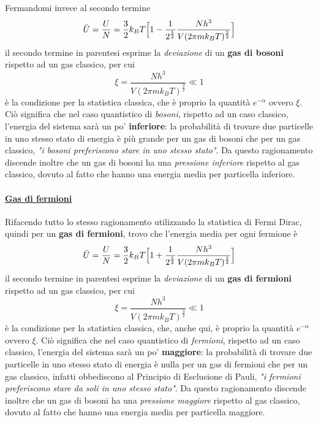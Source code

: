 Fermandomi invece al secondo termine
\begin{equation}
\bar U = \frac{U}{N} = \frac{3}{2} k_B T \Bigl[  1 - \frac{1}{2^{ \frac{5}{2} }}  \frac{N h^3}{V (2\pi m k_B T)^{ \frac{3}{2} }}  \Bigr]
\end{equation}
il secondo termine in parentesi esprime la \textit{deviazione} di un \textbf{gas di bosoni} rispetto ad un gas classico, per cui
\begin{equation}
\xi = \frac{N h^3}{V (2\pi m k_B T)^{ \frac{3}{2} }}  \ll 1 
\end{equation}
è la condizione per la statistica classica, che è proprio la quantità $e^{-\alpha}$ ovvero $\xi$.
Ciò significa che nel caso quantistico di \textit{bosoni}, rispetto ad un caso classico, l'energia del sistema sarà un po' \textbf{inferiore}:
la probabilità di trovare due particelle in uno stesso stato di energia è più grande per un gas di bosoni che per un gas classico, \textit{"i bosoni preferiscono stare in uno stesso stato"}.
Da questo ragionamento discende inoltre che un gas di bosoni ha una \textit{pressione inferiore} rispetto al gas classico, dovuto al fatto che hanno una energia media per particella inferiore.

\paragraph{\underline{Gas di fermioni}} Rifacendo tutto lo stesso ragionamento utilizzando la statistica di Fermi Dirac, quindi per un \textbf{gas di fermioni}, trovo che l'energia media per ogni fermione è 
\begin{equation}
\bar U = \frac{U}{N} = \frac{3}{2} k_B T \Bigl[  1 + \frac{1}{2^{ \frac{5}{2} }} \frac{N h^3}{V (2\pi m k_B T)^{ \frac{3}{2} }} \Bigr]
\end{equation}
il secondo termine in parentesi esprime la \textit{deviazione} di un \textbf{gas di fermioni} rispetto ad un gas classico, per cui
\begin{equation}
\xi = \frac{N h^3}{V (2\pi m k_B T)^{ \frac{3}{2} }}  \ll 1 
\end{equation}
è la condizione per la statistica classica, che, anche qui, è proprio la quantità $e^{-\alpha}$ ovvero $\xi$.
Ciò significa che nel caso quantistico di \textit{fermioni}, rispetto ad un caso classico, l'energia del sistema sarà un po' \textbf{maggiore}:
la probabilità di trovare due particelle in uno stesso stato di energia è nulla per un gas di fermioni che per un gas classico, infatti obbediscono al Principio di Esclusione di Pauli, \textit{"i fermioni preferiscono stare da soli in uno stesso stato"}.
Da questo ragionamento discende inoltre che un gas di bosoni ha una \textit{pressione maggiore} rispetto al gas classico, dovuto al fatto che hanno una energia media per particella maggiore.


